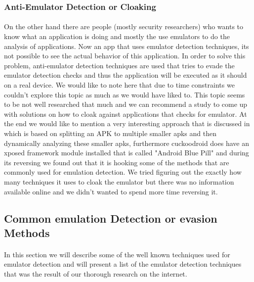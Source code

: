 \documentclass[../main.tex]{subfile}
\begin{document}
	\subsubsection{Anti-Emulator Detection or Cloaking}\label{sec::anti_emu_detection}
	\paragraph{} On the other hand there are people (mostly security researchers) who wants to know what an application is doing and mostly the use emulators to do the analysis of applications. Now an app that uses emulator detection techniques, its not possible to see the actual behavior of this application. In order to solve this problem, anti-emulator detection techniques are used that tries to evade the emulator detection checks and thus the application will be executed as it should on a real device. We would like to note here that due to time constraints we couldn't explore this topic as much as we would have liked to. This topic seems to be not well researched that much and we can recommend a study to come up with solutions on how to cloak against applications that checks for emulator. At the end we would like to mention a very interesting approach that is discussed in \cite{rasthofer2016harvesting} which is based on splitting an APK to multiple smaller apks and then dynamically analyzing these smaller apks, furthermore cuckoodroid does have an xposed framework module installed that is called "Android Blue Pill" and during its reversing we found out that it is hooking some of the methods that are commonly used for emulation detection. We tried figuring out the exactly how many techniques it uses to cloak the emulator but there was no information available online and we didn't wanted to spend more time reversing it.
	
	\subsection{Common emulation Detection or evasion Methods}\label{sec::common_methods_detection}
	\paragraph{} In this section we will describe some of the well known techniques used for emulator detection and will present a list of the emulator detection techniques that was the result of our thorough research on the internet.
\end{document}
